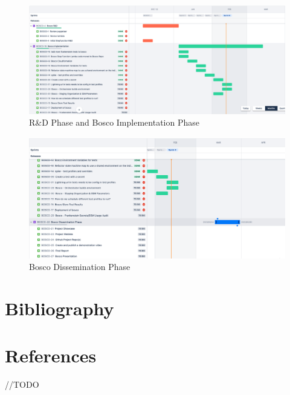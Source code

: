 \documentclass[12pt,a4paper,titlepage]{report}
\begin{document}
\begin{figure}[h]
 \centering
 \includegraphics[width=15cm]{./diagrams/sprints1.png}
 \caption{R\&D Phase and Bosco Implementation Phase}
\end{figure}

\begin{figure}[h]
 \centering
 \includegraphics[width=15cm]{./diagrams/sprints2.png}
 \caption{Bosco Dissemination Phase}
\end{figure}


\chapter{Bibliography}

\printbibliography


\chapter{References}
//TODO
\end{document}

